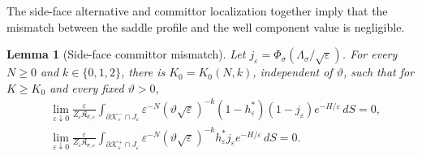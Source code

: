 \documentclass[11pt]{article}
\numberwithin{equation}{section}
\theoremstyle{plain}
\newtheorem{lemma}[theorem]{Lemma}
\theoremstyle{definition}
\theoremstyle{remark}
\newcommand{\eps}{\varepsilon}
\begin{document}
The side-face alternative and committor localization together
imply that the mismatch between the saddle profile and the well component
value is negligible.

\begin{lemma}[Side-face committor mismatch]
\label{lem:side-face-mismatch}
Let $j_\eps=\Phi_\sigma(\Lambda_\sigma/\sqrt\eps)$.  For every
$N\ge0$ and $k\in\{0,1,2\}$, there is $K_0=K_0(N,k)$, independent of
$\vartheta$, such that for $K\ge K_0$ and every fixed $\vartheta>0$,
\begin{align*}
&\lim_{\eps\downarrow0}
\frac{\eps}{Z_\eps\mathfrak K_{\sigma,\eps}}
\int_{\partial\mathcal K_\eps^-\cap J_\eps}
\eps^{-N}(\vartheta\sqrt\eps)^{-k}
(1-h_\eps^*)(1-j_\eps)e^{-H/\eps}\,dS=0,
\\
&\lim_{\eps\downarrow0}
\frac{\eps}{Z_\eps\mathfrak K_{\sigma,\eps}}
\int_{\partial\mathcal K_\eps^+\cap J_\eps}
\eps^{-N}(\vartheta\sqrt\eps)^{-k}
h_\eps^*j_\eps e^{-H/\eps}\,dS=0.
\end{align*}
\end{lemma}
\end{document}
